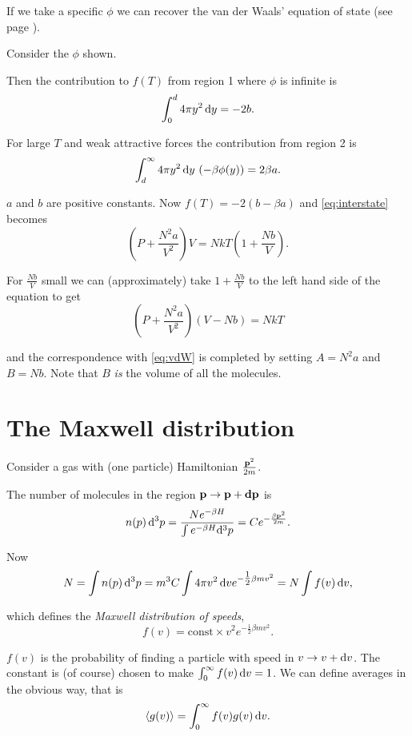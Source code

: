 \documentclass{notes}
\newcommand{\ave}[1]{\langle#1\rangle}
\begin{document}
If we take a specific $\phi$ we can recover the van der Waals'
equation of state (see page \pageref{eq:vdW}).  

Consider the $\phi$ shown.

\vspace{1.5in}

Then the contribution to $f(T)$ from region 1 where $\phi$ is infinite
is
\[
\int_0^d 4 \pi y^2\, \mathrm{d} y = -2 b.
\]

For large $T$ and weak attractive forces the contribution from region
2 is
\[
\int_d^\infty 4 \pi y^2\, \mathrm{d} y\, \left( - \beta \phi(y) \right) =
2 \beta a.
\]

$a$ and $b$ are positive constants.  Now $f(T) = -2 ( b - \beta a)$
and \eqref{eq:interstate} becomes
\[
\left( P + \frac{ N^2 a}{V^2}\right) V = N k T \left( 1 + \frac{ N
    b}{V} \right).
\]

For $\tfrac{N b}{V}$ small we can (approximately) take $1 + \tfrac{N
  b}{V}$ to the left hand side of the equation to get
\[
\left( P + \frac{N^2 a}{V^2} \right) \left(V - N b \right) = N k T
\]

and the correspondence with \eqref{eq:vdW} is completed by
setting $A = N^2 a$ and $B = N b$.  Note that $B$ \emph{is} the
volume of all the molecules.

\section{The Maxwell distribution}

Consider a gas with (one particle) Hamiltonian $\frac{\mathbf{p}^2}{2m}$.

The number of molecules in the region
$\mathbf{p} \to \mathbf{p} + \mathbf{dp}$ is
\[
n(p)\, \mathrm{d}^3 p = \frac{ N e^{-\beta H}}{\int e^{-\beta H} \mathrm{d}^3 p}
= C e^{-\frac{\beta \mathbf{p}^2}{2 m}}.
\]

Now
\[
N = \int n(p)\, \mathrm{d}^3 p = m^3 C \int 4 \pi v^2\, \mathrm{d} v
e^{-\tfrac{1}{2} \beta m v^2} = N \int f(v)\, \mathrm{d} v,
\]

which defines the \emph{Maxwell distribution of speeds},
\[
f(v) = \text{const} \times v^2 e^{-\tfrac{1}{2} \beta m v^2}.
\]

$f(v)$ is the probability of finding a particle with speed in $v \to v
+ \mathrm{d} v$.  The constant is (of course) chosen to make $\int_0^\infty
f(v)\, \mathrm{d} v = 1$.  We can define averages in the obvious way, that is
\[
\ave{g(v)} = \int_0^\infty f(v) g(v)\, \ud v.
\]

\backmatter

\appendix
\end{document}
